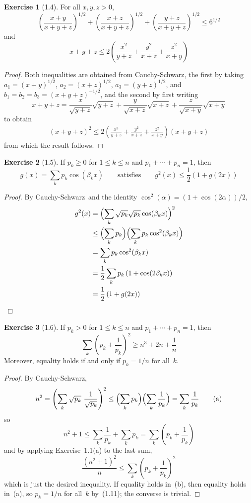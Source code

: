 \documentclass[letterpaper,12pt]{article}
\newcommand{\CS}{Cauchy-Schwarz}
\newcommand{\Biglp}[1]{\Bigl({#1}\Bigr)}
\theoremstyle{definition}
\newtheorem*{exer}{Exercise}
\theoremstyle{remark}
\begin{document}
\begin{exer}[1.4]
For all \(x,y,z>0\),
\[\left(\frac{x+y}{x+y+z}\right)^{1/2}+\left(\frac{x+z}{x+y+z}\right)^{1/2}+\left(\frac{y+z}{x+y+z}\right)^{1/2}\le 6^{1/2}\tag{a}\]
and
\[x+y+z\le 2\left(\frac{x^2}{y+z}+\frac{y^2}{x+z}+\frac{z^2}{x+y}\right)\tag{b}\]
\end{exer}
\begin{proof}
Both inequalities are obtained from \CS, the first by taking \(a_1=(x+y)^{1/2}\), \(a_2=(x+z)^{1/2}\), \(a_3=(y+z)^{1/2}\), and \(b_1=b_2=b_3=(x+y+z)^{-1/2}\), and the second by first writing
\[x+y+z=\frac{x}{\sqrt{y+z}}\sqrt{y+z}+\frac{y}{\sqrt{x+z}}\sqrt{x+z}+\frac{z}{\sqrt{x+y}}\sqrt{x+y}\]
to obtain
\begin{align*}
(x+y+z)^2\le2\left(\frac{x^2}{y+z}+\frac{y^2}{x+z}+\frac{z^2}{x+y}\right)(x+y+z)
\end{align*}
from which the result follows.
\end{proof}

\begin{exer}[1.5]
If \(p_k\ge 0\) for \(1\le k\le n\) and \(p_1+\cdots+p_n=1\), then
\[g(x)=\sum_k p_k\cos(\beta_k x)\qquad\text{satisfies}\qquad g^2(x)\le\frac{1}{2}\left(1+g(2x)\right)\]
\end{exer}
\begin{proof}
By \CS\ and the identity \(\cos^2(\alpha)=(1+\cos(2\alpha))/2\),
\begin{align*}
g^2(x)&=\Biglp{\sum_k\sqrt{p_k}\sqrt{p_k}\cos(\beta_k x)}^2\\
	&\le\Biglp{\sum_k p_k}\Biglp{\sum_k p_k\cos^2(\beta_k x)}\\
	&=\sum_k p_k\cos^2(\beta_k x)\\
	&=\frac{1}{2}\sum_k p_k\left(1+\cos(2\beta_k x)\right)\\
	&=\frac{1}{2}\left(1+g(2x)\right)\qedhere
\end{align*}
\end{proof}

\begin{exer}[1.6]
If \(p_k>0\) for \(1\le k\le n\) and \(p_1+\cdots+p_n=1\), then
\[\sum_k\left(p_k+\frac{1}{p_k}\right)^2\ge n^3+2n+\frac{1}{n}\]
Moreover, equality holds if and only if \(p_k=1/n\) for all~\(k\).
\end{exer}
\begin{proof}
By \CS,
\[n^2=\left(\sum_k\sqrt{p_k}\ \frac{1}{\sqrt{p_k}}\right)^2\le\Biglp{\sum_k p_k}\Biglp{\sum_k\frac{1}{p_k}}=\sum_k\frac{1}{p_k}\tag{a}\]
so
\[n^2+1\le\sum_k\frac{1}{p_k}+\sum_k p_k=\sum_k\left(p_k+\frac{1}{p_k}\right)\]
and by applying Exercise~1.1(a) to the last sum,
\[\frac{(n^2+1)^2}{n}\le\sum_k\left(p_k+\frac{1}{p_k}\right)^2\tag{b}\]
which is just the desired inequality. If equality holds in~(b), then equality holds in~(a), so \(p_k=1/n\) for all~\(k\) by~(1.11); the converse is trivial.
\end{proof}
\end{document}
